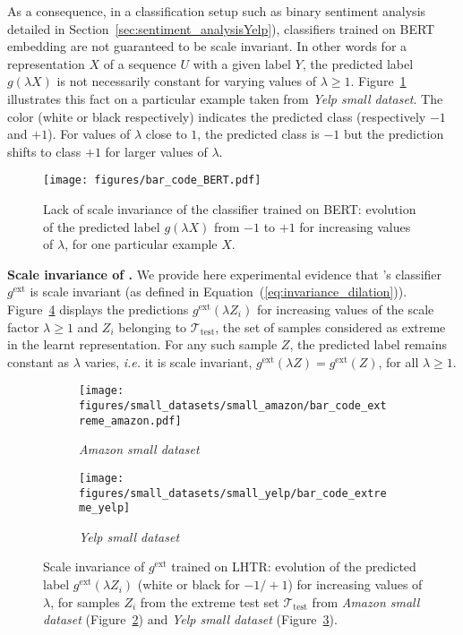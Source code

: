 As a consequence, 
in a classification setup such as binary sentiment analysis  detailed in Section~\ref{sec:sentiment_analysisYelp}), classifiers trained on BERT embedding are not guaranteed to be scale invariant. In other words for a representation $X$ of a sequence $U$ with a given label $Y$, the predicted label $g(\lambda X)$ is not necessarily constant for varying values of $\lambda \geq 1$.
Figure~\ref{fig:barcode_bert} illustrates this fact on a particular example taken from \textit{Yelp small dataset}. The color (white or black respectively) indicates the predicted class (respectively $-1$ and $+1$). For values of $\lambda$ close to $1$, the predicted class is $-1$ but the prediction shifts to class $+1$  for larger values of $\lambda$. 
\begin{figure}[h]
    \centering
    \texttt{[image: figures/bar\_code\_BERT.pdf]}
    \caption{Lack of scale invariance of the classifier trained on BERT: evolution of the predicted label $g(\lambda X)$ from $-1$ to $+1$ for increasing values of $\lambda$, for one particular example $X$.}
    \label{fig:barcode_bert}
\end{figure}{}

\textbf{Scale invariance of \HTalgo.} We provide here experimental evidence that \HTalgo's classifier $g^\text{ext}$ is scale invariant (as defined in Equation~(\ref{eq:invariance_dilation})). Figure~\ref{fig:barcodes_lhtr} displays the predictions $g^{\text{ext}}(\lambda Z_i)$ for increasing values of the scale factor $\lambda\ge 1$  and $Z_i$ belonging to $\mathcal{T}_{\text{test}}$, the set of samples considered as extreme in the learnt representation. For any such sample $Z$,
the predicted label remains constant as $\lambda$ varies, \emph{i.e.} it is  scale invariant, $g^\text{ext}(\lambda Z) = g^\text{ext}(Z)$, for all $\lambda\ge 1$. 
\begin{figure}[ht]
\centering
\begin{subfigure}[t]{0.45\textwidth}
    \texttt{[image: figures/small\_datasets/small\_amazon/bar\_code\_extreme\_amazon.pdf]}
    \caption{\textit{Amazon small dataset}}
    \label{fig:bar_code_amazon}
\end{subfigure}
\begin{subfigure}[t]{0.45\textwidth}
    \texttt{[image: figures/small\_datasets/small\_yelp/bar\_code\_extreme\_yelp]}
    \caption{\textit{Yelp small dataset}}
    \label{fig:bar_code_yelp}
\end{subfigure}
\caption{Scale invariance of $g^\text{ext}$ trained on LHTR: evolution of the predicted label   $g^\text{ext}(\lambda Z_i)$ (white or black for $-1 / +1$) for increasing values of $\lambda$, for samples $Z_i$ from the extreme test set $\mathcal{T}_\text{test}$ from \textit{Amazon small dataset} (Figure~\ref{fig:bar_code_amazon}) and  \textit{Yelp small dataset} (Figure~\ref{fig:bar_code_yelp})\label{fig:barcodes_lhtr}.}
\end{figure}

